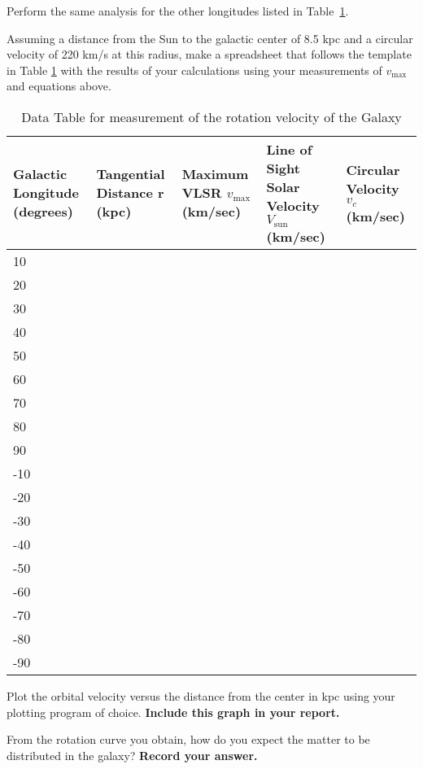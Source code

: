\begin{steps}
\item Perform the same analysis for the other longitudes listed in Table~\ref{sgr:tab:data}.

\item Assuming a distance from the Sun to the galactic center of 8.5 kpc and
a circular velocity of 220 km/s at this radius, make a spreadsheet that follows the template in Table \ref{sgr:tab:data} with the
results of your calculations using your measurements of $v_\textrm{max}$ and
equations above.
\end{steps}

\begin{table}
	\centering
	\begin{tabular}{|p{3cm}|p{3cm}|p{3cm}|p{3cm}|p{3cm}|}
		\toprule
		Galactic Longitude (degrees) & Tangential Distance r (kpc) & Maximum VLSR $v_\textrm{max}$ (km/sec) & Line of Sight Solar Velocity $V_\textrm{sun}$ (km/sec) & Circular Velocity $v_c$ (km/sec) \\ \midrule 10 & & & & \\ \midrule 20 &&&& \\ \midrule 30 &&&&\\ \midrule 40 &&&& \\ \midrule 50 &&&& \\ \midrule 60 &&&& \\ \midrule 70 &&&& \\ \midrule 80 &&&& \\ \midrule 90 &&&& \\ \midrule -10 &&&& \\ \midrule -20 &&&& \\ \midrule -30 &&&& \\ \midrule -40 &&&& \\ \midrule -50&&&& \\ \midrule -60 &&&& \\ \midrule -70 &&&& \\ \midrule -80 &&&& \\ \midrule -90 &&&& \\ \bottomrule
	\end{tabular}
	\caption{Data Table for measurement of the rotation velocity of the Galaxy}\label{sgr:tab:data}
\end{table}

\begin{steps}
\item Plot the orbital velocity versus the distance from the center in kpc using your plotting program of choice. \textbf{Include this graph in your report.}

\item From the rotation curve you obtain, how do you expect the matter to be distributed in the galaxy? \textbf{Record your answer.}
\end{steps}

